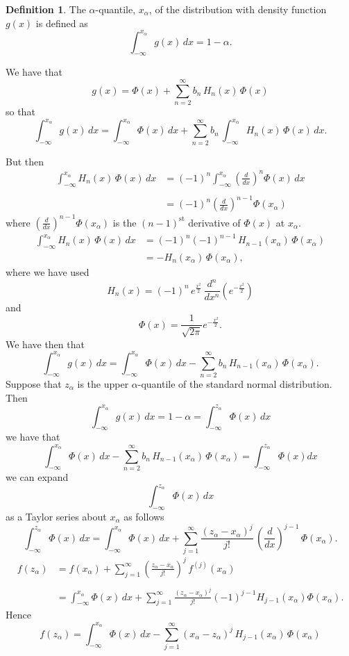 \documentclass[12pt,a4paper]{report}
\theoremstyle{definition}
\newtheorem{defn}[thm]{Definition}
\theoremstyle{plain}
\begin{document}
\begin{defn}
The $\alpha$-quantile, $x_{\alpha}$, of the distribution with density function $g(x)$ is defined as $$\int_{-\infty}^{x_{\alpha}}g(x)\, dx = 1 - \alpha.$$
\end{defn}
We have that $$g(x) = \Phi(x) + \sum_{n=2}^{\infty}b_n\, H_n(x)\, \Phi(x)$$ so that
$$\int_{-\infty}^{x_{\alpha}}g(x)\, dx = \int_{-\infty}^{x_{\alpha}}\Phi(x)\, dx + \sum_{n = 2}^{\infty} b_n \, \int_{-\infty}^{x_{\alpha}}H_n(x)\, \Phi(x)\, dx.$$


But then 
\begin{align*}
\int_{-\infty}^{x_{\alpha}}H_n(x)\, \Phi(x)\, dx & = (-1)^n\int_{-\infty}^{x_{\alpha}}\left(\frac{d}{dx}\right)^n\Phi(x)\, dx\\\\
&= (-1)^n\left(\frac{d}{dx}\right)^{n-1}\Phi(x_{\alpha})
\end{align*}
where  $\left(\frac{d}{dx}\right)^{n-1}\Phi(x_{\alpha})$ is the $(n-1)^{\text{st}}$ derivative of $\Phi(x)$ at $x_{\alpha}$.
\begin{align*}
\int_{-\infty}^{x_{\alpha}}H_n(x)\, \Phi(x)\, dx & = (-1)^n(-1)^{n-1}\, H_{n-1}(x_{\alpha})\, \Phi(x_{\alpha})\\
         & = -H_n(x_{\alpha})\, \Phi(x_{\alpha}),
\end{align*}
where we have used
$$H_n(x) = (-1)^n\, e^{\frac{x^2}{2}}\, \frac{d^n}{dx^n}\left(e^{-\frac{x^2}{2}}\right)$$
and
$$\Phi(x) = \frac{1}{\sqrt{2\pi}}e^{-\frac{x^2}{2}}.$$
We have then that
$$\int_{-\infty}^{x_{\alpha}} g(x)\, dx = \int_{-\infty}^{x_{\alpha}}\Phi(x)\, dx - \sum_{n=2}^{\infty} b_n\, H_{n-1}(x_{\alpha})\, \Phi(x_{\alpha}).$$
Suppose that $z_{\alpha}$ is the upper $\alpha$-quantile of the standard normal distribution. Then 
$$\int_{-\infty}^{x_{\alpha}}g(x)\, dx = 1 - \alpha = \int_{-\infty}^{z_{\alpha}}\Phi(x)\, dx$$
we have that
\begin{equation}
\int_{-\infty}^{x_{\alpha}}\Phi(x)\, dx - \sum_{n=2}^{\infty}b_n\, H_{n-1}(x_{\alpha})\, \Phi(x_{\alpha}) = \int_{-\infty}^{z_{\alpha}}\Phi(x)dx
\end{equation}
we can expand $$\int_{-\infty}^{z_{\alpha}}\Phi(x)\, dx$$ as a Taylor series about $x_{\alpha}$ as follows
$$\int_{-\infty}^{z_{\alpha}}\Phi(x)\, dx = \int_{-\infty}^{x_{\alpha}} \Phi(x)\, dx + \sum_{j=1}^{\infty} \frac{(z_{\alpha} - x_{\alpha})^j}{j!}\, \left(\frac{d}{dx}\right)^{j-1}\, \Phi(x_{\alpha}).$$
\begin{align*}
f(z_{\alpha}) & = f(x_{\alpha}) + \sum_{j = 1}^{\infty} \left(\frac{z_{\alpha} - x_{\alpha}}{j!}\right)^j\, f^{(j)}(x_{\alpha})\\\\
& = \int_{-\infty}^{x_{\alpha}} \Phi(x)\, dx + \sum_{j = 1}^{\infty} \frac{(z_{\alpha} - x_{\alpha})^j}{j!}(-1)^{j-1}H_{j-1}(x_{\alpha}) \Phi(x_{\alpha}). 
\end{align*}
Hence
\begin{equation}
f(z_{\alpha}) = \int_{-\infty}^{x_{\alpha}}\Phi(x)\, dx - \sum_{j=1}^{\infty}(x_{\alpha}-z_{\alpha})^j\, H_{j-1}(x_{\alpha})\, \Phi(x_{\alpha})
\end{equation}
\end{document}
